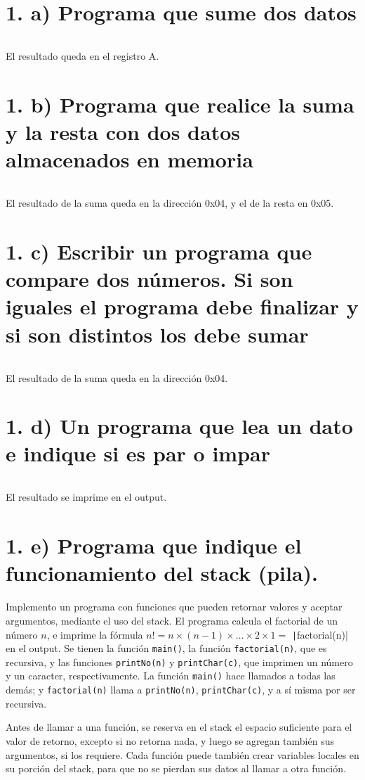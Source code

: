 \documentclass{article}
\begin{document}


\section*{1. a) Programa que sume dos datos}
\inputminted{nasm}{./code/1a.txt}
El resultado queda en el registro A.

\section*{1. b) Programa que realice la suma y la resta con dos datos almacenados en memoria}
\inputminted{nasm}{./code/1b.txt}
El resultado de la suma queda en la dirección 0x04, y el de la resta en 0x05.

\section*{1. c) Escribir un programa que compare dos números. Si son iguales el programa debe finalizar y si son distintos los debe sumar}
\inputminted{nasm}{./code/1c.txt}
El resultado de la suma queda en la dirección 0x04.

\section*{1. d) Un programa que lea un dato e indique si es par o impar}
\inputminted{nasm}{./code/1d.txt}
El resultado se imprime en el output.

\section*{1. e) Programa que indique el funcionamiento del stack (pila).}
Implemento un programa con funciones que pueden retornar valores y aceptar argumentos, mediante el uso del stack. El programa calcula el factorial de un número $n$, e imprime la fórmula $n! = n \times (n-1) \times \dots \times 2 \times 1 =$ \texttt|factorial(n)| en el output. Se tienen la función \texttt{main()}, la función \texttt{factorial(n)}, que es recursiva, y las funciones \texttt{printNo(n)} y \texttt{printChar(c)}, que imprimen un número y un caracter, respectivamente. La función \texttt{main()} hace llamados a todas las demás; y \texttt{factorial(n)} llama a \texttt{printNo(n)}, \texttt{printChar(c)}, y a sí misma por ser recursiva. 

Antes de llamar a una función, se reserva en el stack el espacio suficiente para el valor de retorno, excepto si no retorna nada, y luego se agregan también sus argumentos, si los requiere. Cada función puede también crear variables locales en su porción del stack, para que no se pierdan sus datos al llamar a otra función.
\inputminted{nasm}{./code/1e.txt}
\end{document}
